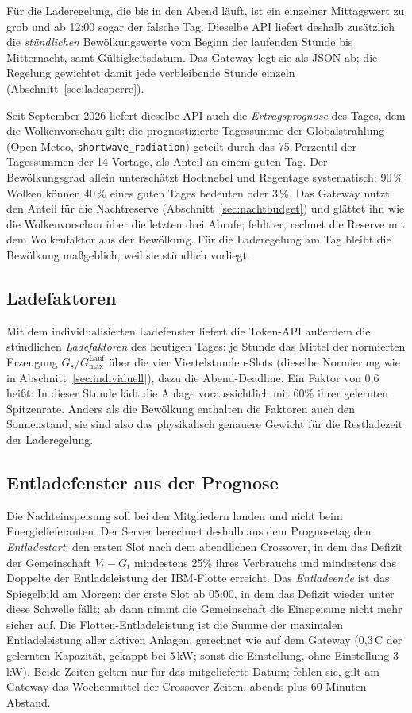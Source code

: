 \documentclass[11pt,a4paper]{article}
\newcommand{\code}[1]{\texttt{#1}}
\begin{document}
Für die Laderegelung, die bis in den Abend läuft, ist ein einzelner
Mittagswert zu grob und ab 12:00 sogar der falsche Tag. Dieselbe API
liefert deshalb zusätzlich die \emph{stündlichen} Bewölkungswerte vom
Beginn der laufenden Stunde bis Mitternacht, samt Gültigkeitsdatum. Das
Gateway legt sie als JSON ab; die Regelung gewichtet damit jede
verbleibende Stunde einzeln (Abschnitt~\ref{sec:ladesperre}).

Seit September 2026 liefert dieselbe API auch die \emph{Ertragsprognose}
des Tages, dem die Wolkenvorschau gilt: die prognostizierte Tagessumme
der Globalstrahlung (Open-Meteo, \code{shortwave\_radiation}) geteilt
durch das 75.\,Perzentil der Tagessummen der 14 Vortage, als Anteil an
einem guten Tag. Der Bewölkungsgrad allein unterschätzt Hochnebel und
Regentage systematisch: 90\,\% Wolken können 40\,\% eines guten Tages
bedeuten oder 3\,\%. Das Gateway nutzt den Anteil für die Nachtreserve
(Abschnitt~\ref{sec:nachtbudget}) und glättet ihn wie die Wolkenvorschau
über die letzten drei Abrufe; fehlt er, rechnet die Reserve mit dem
Wolkenfaktor aus der Bewölkung. Für die Laderegelung am Tag bleibt die
Bewölkung maßgeblich, weil sie stündlich vorliegt.

\subsection{Ladefaktoren}\label{sec:ladefaktoren}

Mit dem individualisierten Ladefenster liefert die Token-API außerdem die
stündlichen \emph{Ladefaktoren} des heutigen Tages: je Stunde das Mittel
der normierten Erzeugung $G_s / G_{\max}^{\text{Lauf}}$ über die vier
Viertelstunden-Slots (dieselbe Normierung wie in
Abschnitt~\ref{sec:individuell}), dazu die Abend-Deadline. Ein Faktor von
0,6 heißt: In dieser Stunde lädt die Anlage voraussichtlich mit 60\% ihrer
gelernten Spitzenrate. Anders als die Bewölkung enthalten die Faktoren
auch den Sonnenstand, sie sind also das physikalisch genauere Gewicht für
die Restladezeit der Laderegelung.

\subsection{Entladefenster aus der Prognose}\label{sec:entladefenster}

Die Nachteinspeisung soll bei den Mitgliedern landen und nicht beim
Energielieferanten. Der Server berechnet deshalb aus dem Prognosetag den
\emph{Entladestart}: den ersten Slot nach dem abendlichen Crossover, in dem
das Defizit der Gemeinschaft $V_t - G_t$ mindestens 25\% ihres Verbrauchs
und mindestens das Doppelte der Entladeleistung der IBM-Flotte erreicht.
Das \emph{Entladeende} ist das Spiegelbild am Morgen: der erste Slot ab
05:00, in dem das Defizit wieder unter diese Schwelle fällt; ab dann nimmt
die Gemeinschaft die Einspeisung nicht mehr sicher auf. Die
Flotten-Entladeleistung ist die Summe der maximalen Entladeleistung aller
aktiven Anlagen, gerechnet wie auf dem Gateway (0,3\,C der gelernten
Kapazität, gekappt bei 5\,kW; sonst die Einstellung, ohne Einstellung
3\,kW). Beide Zeiten gelten nur für das mitgelieferte Datum; fehlen sie,
gilt am Gateway das Wochenmittel der Crossover-Zeiten, abends plus 60
Minuten Abstand.
\end{document}
